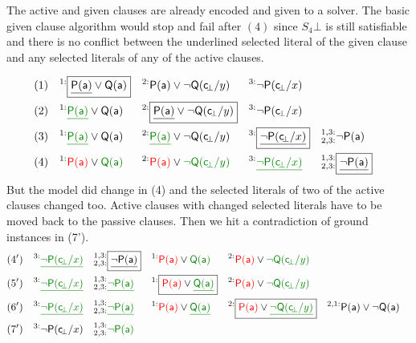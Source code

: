 \begin{example}[InstGen]The active and given clauses are already encoded and given to a \SAT solver.
	The basic given clause algorithm would stop and fail after $(4)$
	since $S_4\bot$ is still satisfiable and there is no conflict between the underlined selected literal of the given clause 
	and any selected literals of any of the active clauses.
	
	
	\begin{align*}
	(1)\quad^{1:}&\boxed{\underline{\mP(\ma)}\lor\mQ(\ma)} 
	& ^{2:}&\mP(\ma)\lor\lnot\mQ(\consbot/y) 
	& ^{3:}&\lnot\mP(\consbot/x)
	\\
	(2)\quad^{1:}&{\colHi\underline{\mP(\ma)}}\lor\mQ(\ma) 
	& ^{2:}&\boxed{\underline{\mP(\ma)}\lor\lnot\mQ(\consbot/y)} 
	& ^{3:}&\lnot\mP(\consbot/x) 
	\\
	(3)\quad^{1:}&{\colHi\underline{\mP(\ma)}}\lor\mQ(\ma) 
	& ^{2:}&{\colHi\underline{\mP(\ma)}}\lor\lnot\mQ(\consbot/y) 
	& ^{3:}&\boxed{\underline{\lnot\mP(\consbot/x)}} 
	& ^{1,3:}_{2,3:}&\lnot\mP(\ma)
	\\
	(4)\quad
	^{1:}&{\colLo\mP(\ma)}\lor\colHi\mQ(\ma) 
	& ^{2:}&{\colLo\mP(\ma)}\lor\colHi\lnot\mQ(\consbot/y) 
	& ^{3:}&{\colHi\underline{\lnot\mP(\consbot/x)}} 
	& ^{1,3:}_{2,3:}&\boxed{\underline{\lnot\mP(\ma)}}
	\end{align*}
	But the model did change in (4) and the selected literals of two of the active clauses changed too.
	Active clauses with changed selected literals have to be moved back to the passive clauses.
	Then we hit a contradiction of ground instances in (7').
	\begin{align*}
	(4')\quad^{3:}&{\underline{\colHi\lnot\mP(\consbot/x)}} 
	& ^{1,3:}_{2,3:}&\boxed{\underline{\lnot\mP(\ma)}}
	& ^{1:}&{\colLo\mP(\ma)}\lor\colHi\mQ(\ma) 
	& ^{2:}&{\colLo\mP(\ma)}\lor\colHi\lnot\mQ(\consbot/y)
	\\
	(5')\quad^{3:}&{\underline{\colHi\lnot\mP(\consbot/x)}} 
	& ^{1,3:}_{2,3:}&\colHi\underline{\lnot\mP(\ma)}
	& ^{1:}&\boxed{{\colLo\mP(\ma)}\lor\colHi\underline{\mQ(\ma)}} 
	& ^{2:}&{\colLo\mP(\ma)}\lor\colHi\lnot\mQ(\consbot/y)
	\\
	(6')\quad^{3:}&{\colHi\underline{\lnot\mP(\consbot/x)}} 
	& ^{1,3:}_{2,3:}&\colHi\underline{\lnot\mP(\ma)}
	& ^{1:}&{\colLo\mP(\ma)}\lor\colHi\underline{\mQ(\ma)} 
	& ^{2:}&\boxed{{\colLo\mP(\ma)}\lor\colHi\underline{\lnot\mQ(\consbot/y)}}
	& ^{2,1:}&\mP(\ma)\lor\lnot\mQ(\ma)
	\\
	(7')\quad^{3:}&{\lnot\mP(\consbot/x)} 
	& ^{1,3:}_{2,3:}&\colHi\lnot\mP(\tikzmark{NP}\ma)

\end{align*}
\end{example}
